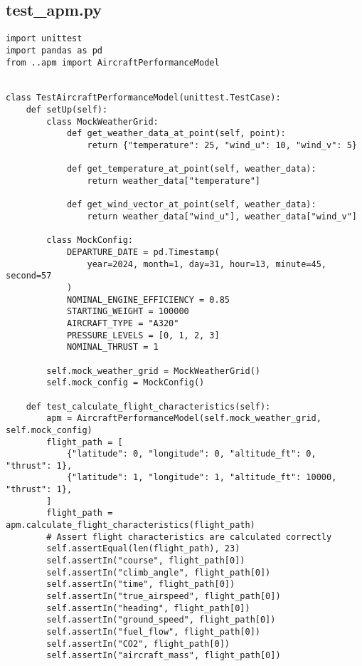 \subsection{test_apm.py}
\begin{verbatim}
import unittest
import pandas as pd
from ..apm import AircraftPerformanceModel


class TestAircraftPerformanceModel(unittest.TestCase):
    def setUp(self):
        class MockWeatherGrid:
            def get_weather_data_at_point(self, point):
                return {"temperature": 25, "wind_u": 10, "wind_v": 5}

            def get_temperature_at_point(self, weather_data):
                return weather_data["temperature"]

            def get_wind_vector_at_point(self, weather_data):
                return weather_data["wind_u"], weather_data["wind_v"]

        class MockConfig:
            DEPARTURE_DATE = pd.Timestamp(
                year=2024, month=1, day=31, hour=13, minute=45, second=57
            )
            NOMINAL_ENGINE_EFFICIENCY = 0.85
            STARTING_WEIGHT = 100000
            AIRCRAFT_TYPE = "A320"
            PRESSURE_LEVELS = [0, 1, 2, 3]
            NOMINAL_THRUST = 1

        self.mock_weather_grid = MockWeatherGrid()
        self.mock_config = MockConfig()

    def test_calculate_flight_characteristics(self):
        apm = AircraftPerformanceModel(self.mock_weather_grid, self.mock_config)
        flight_path = [
            {"latitude": 0, "longitude": 0, "altitude_ft": 0, "thrust": 1},
            {"latitude": 1, "longitude": 1, "altitude_ft": 10000, "thrust": 1},
        ]
        flight_path = apm.calculate_flight_characteristics(flight_path)
        # Assert flight characteristics are calculated correctly
        self.assertEqual(len(flight_path), 23)
        self.assertIn("course", flight_path[0])
        self.assertIn("climb_angle", flight_path[0])
        self.assertIn("time", flight_path[0])
        self.assertIn("true_airspeed", flight_path[0])
        self.assertIn("heading", flight_path[0])
        self.assertIn("ground_speed", flight_path[0])
        self.assertIn("fuel_flow", flight_path[0])
        self.assertIn("CO2", flight_path[0])
        self.assertIn("aircraft_mass", flight_path[0])

\end{verbatim}

